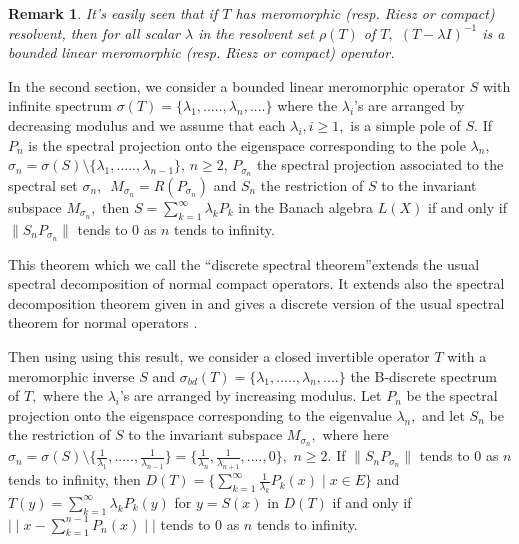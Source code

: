 \documentclass[11pt]{article}
\numberwithin{equation}{section} \allowdisplaybreaks
\newtheorem{remark}[theorem]{\sc Remark}
\newcommand{\bremark}{\begin{remark}\rm}
\newcommand{\eremark}{\end{remark}}
\begin{document}
 \bremark It's easily seen that if $T$ has meromorphic (resp. Riesz or compact)  resolvent, then
 for all
scalar $\lambda $ in the resolvent set $ \rho(T)$  of  $T,$  $
(T-\lambda I)^{-1}$ is a  bounded linear meromorphic (resp. Riesz
or compact) operator.

 \eremark












 In the second  section,
we consider   a  bounded  linear meromorphic operator $S$  with
infinite spectrum   $  \sigma(T)= \{ \lambda_1,.....,
\lambda_n,....\}$  where the $ \lambda_i $'s are arranged by
decreasing modulus and we assume that each $ \lambda_i, i\geq 1,$
is a simple pole of $S.$ If  $P_n$ is the spectral projection onto
the eigenspace corresponding to the pole $\lambda_n,$  $ \sigma_n=
\sigma(S) \setminus
   \{  \lambda_1,....., \lambda_{n-1}\}, \,  n\geq 2, \,  P_{\sigma_n}$ the
spectral projection associated to the spectral set  $\sigma_n,$
\,$M_{\sigma_n}= R(P_{\sigma_n})$  and $ S_n$ the restriction of
$S$ to the invariant subspace $M_{\sigma_n},$  then  $S =
\displaystyle \sum_{k=1}^{\infty}\lambda_k P_k$ in the Banach
algebra $L(X)$ if and only if $\|S_n P_{\sigma_n}\|$ tends to $0$
as $n$ tends to infinity.

This theorem  which we call the ``discrete spectral
theorem''extends the usual spectral decomposition of normal
compact operators. It extends also the spectral decomposition
theorem  given in \cite[Theorem 54.1]{HEU} and gives a discrete
version of the usual spectral theorem for normal operators
\cite[Theorem 7.3]{TLY}.

Then using using this result, we consider   a closed invertible
operator  $T$ with a meromorphic inverse $S$  and   $
\sigma_{bd}(T)= \{ \lambda_1,....., \lambda_n,....\}$ the
B-discrete spectrum  of  $T,$ where the $\lambda_i$'s are arranged
by increasing modulus. Let $P_n$ be the spectral projection onto
the eigenspace corresponding to the eigenvalue $\lambda_n,$ and
let $ S_n$ be the restriction of $S$ to the invariant subspace
$M_{\sigma_n},$ where here $\sigma_n = \sigma(S) \setminus
   \{  \frac{1}{\lambda_1},....., \frac{1}{\lambda_{n-1}}\}=  \{  \frac{1}{\lambda_n},
    \frac{1}{\lambda_{n+1}},...., 0\}, \,\,  n\geq 2. $
If $\|S_n P_{\sigma_n} \|$ tends to $0$ as $n$ tends to infinity,
then  $ D(T)= \{ \displaystyle \sum_{k=1}^{\infty}
\frac{1}{\lambda_k} P_k (x) \mid x \in E \}$ and $ T(y)=
\displaystyle \sum_{k=1}^{\infty} \lambda_k P_k(y) $ for  $y=
S(x)$ in $D(T)$
 if and only if $\mid \mid x- \displaystyle
\sum_{k=1}^{n-1} P_n(x)\mid \mid $ tends to $0$ as $ n$ tends to
infinity.
\end{document}
